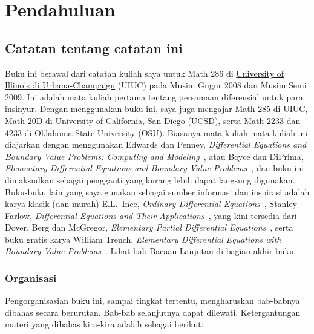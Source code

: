 \chapter*{Pendahuluan} \label{intro:chapter}


\section{Catatan tentang catatan ini}
\label{notes:section}



Buku ini berawal dari catatan kuliah saya untuk Math 286
di \href{https://www.math.uiuc.edu/}{University of Illinois di
Urbana-Champaign} (UIUC)
pada Musim Gugur 2008 dan
Musim Semi 2009.
Ini adalah mata kuliah pertama tentang persamaan diferensial untuk para insinyur.
Dengan menggunakan buku ini, saya juga mengajar Math 285 di UIUC\@,
Math 20D di
\href{https://www.math.ucsd.edu/}{University of California, San Diego} (UCSD),
serta Math 2233 dan 4233 di
\href{https://math.okstate.edu/}{Oklahoma State University} (OSU).
Biasanya mata kuliah-mata kuliah ini diajarkan dengan menggunakan
Edwards dan Penney, \emph{Differential
Equations and Boundary Value Problems: Computing and Modeling}~\cite{EP}, atau
Boyce dan DiPrima,
\emph{Elementary
Differential Equations and Boundary Value Problems}~\cite{BD},
dan buku ini dimaksudkan sebagai pengganti yang kurang lebih dapat langsung digunakan.
Buku-buku lain yang saya gunakan sebagai sumber informasi dan inspirasi
adalah karya klasik (dan murah) E.L.\ Ince,
\emph{Ordinary Differential Equations}~\cite{I},
Stanley Farlow, \emph{Differential Equations and Their
Applications}~\cite{F}, yang kini tersedia dari Dover,
Berg dan McGregor,
\emph{Elementary Partial Differential Equations}~\cite{BM},
serta buku gratis karya William Trench,
\emph{Elementary
Differential Equations with Boundary Value Problems}~\cite{T}.
Lihat bab \hyperref[furtherreading:chapter]{Bacaan Lanjutan} di bagian akhir buku.

\subsection{Organisasi}

Pengorganisasian buku ini, sampai tingkat tertentu,
mengharuskan bab-babnya dibahas secara berurutan.
Bab-bab selanjutnya dapat dilewati.
Ketergantungan materi yang dibahas kira-kira adalah sebagai berikut:

